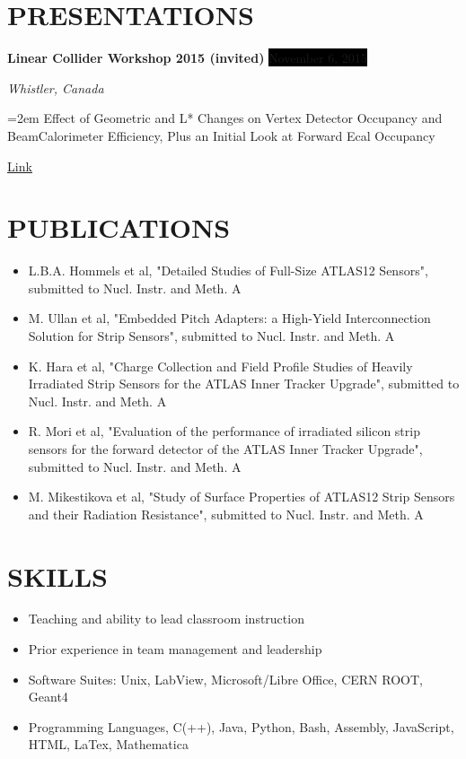 \documentclass[paper=a4,fontsize=11pt]{scrartcl} %
\newcommand{\NewPart}[1]{\section*{\uppercase{#1}}}
\newcommand{\EducationEntry}[4]{
		\noindent \textbf{#1} \hfill      %
		\colorbox{Black}{%
			\parbox{6em}{%
			\hfill\color{White}#2}} \par  %
		\noindent \textit{#3} \par        %
		\noindent\hangindent=2em\hangafter=0 \small #4 %
		\normalsize \par}
\newcommand{\WorkEntry}[4]{				  %
		\noindent \textbf{#1} \hfill      %
		\colorbox{Black}{\color{White}#2} \par  %
		\noindent \textit{#3} \par              %
		\noindent\hangindent=2em\hangafter=0 \small #4 %
		\normalsize \par}
\begin{document}
\NewPart{Presentations}{}
    \WorkEntry {Linear Collider Workshop 2015 (invited)} 
        {November 6, 2015}
        {Whistler, Canada}
        {Effect of Geometric and L* Changes on Vertex Detector Occupancy
        and BeamCalorimeter Efficiency, Plus an Initial Look at Forward Ecal
        Occupancy

        \href{https://agenda.linearcollider.org/event/6662/session/39/contribution/205/material/slides/0.pdf} {\underline{Link}}
        }


\NewPart{Publications}
    \begin{itemize}
        \item[] L.B.A. Hommels et al, "Detailed Studies of Full-Size ATLAS12 Sensors", submitted to Nucl. Instr. and Meth. A
        \item[] M. Ullan et al, "Embedded Pitch Adapters: a High-Yield Interconnection Solution for Strip Sensors", submitted to Nucl. Instr. and Meth. A
        \item[] K. Hara et al, "Charge Collection and Field Profile Studies of Heavily Irradiated Strip Sensors for the ATLAS Inner Tracker Upgrade", submitted to Nucl. Instr. and Meth. A
        \item[] R. Mori et al, "Evaluation of the performance of irradiated silicon strip sensors for the forward detector of the ATLAS Inner Tracker Upgrade", submitted to Nucl. Instr. and Meth. A
        \item[] M. Mikestikova et al, "Study of Surface Properties of ATLAS12 Strip Sensors and their Radiation Resistance", submitted to Nucl. Instr. and Meth. A
    \end{itemize}



\NewPart{Skills}{}
    \begin{itemize}[itemsep=-3pt]
        \item Teaching and ability to lead classroom instruction
        \item Prior experience in team management and leadership
        \item Software Suites: Unix, LabView, Microsoft/Libre Office, CERN ROOT, Geant4
        \item Programming Languages, C(++), Java, Python, Bash, Assembly, JavaScript, HTML, LaTex, Mathematica
    \end{itemize}
\end{document}
